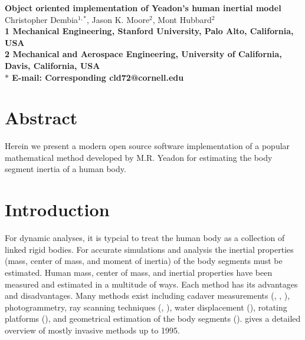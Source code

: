 \documentclass[10pt]{article}
\date{}
\begin{document}
\begin{flushleft}
{\Large
\textbf{Object oriented implementation of Yeadon's human inertial model}
}
\\
Christopher Dembia$^{1,\ast}$,
Jason K. Moore$^{2}$,
Mont Hubbard$^{2}$
\\
\bf{1} Mechanical Engineering, Stanford University, Palo Alto, California, USA
\\
\bf{2} Mechanical and Aerospace Engineering, University of California, Davis, California, USA
\\
$\ast$ E-mail: Corresponding cld72@cornell.edu
\end{flushleft}

\section*{Abstract}
Herein we present a modern open source software implementation of a popular
mathematical method developed by M.R. Yeadon for estimating the body segment
inertia of a human body.

\section*{Introduction}
For dynamic analyses, it is typcial to treat the human body as a collection of
linked rigid bodies. For accurate simulations and analysis the inertial
properties (mass, center of mass, and moment of inertia) of the body segments
must be estimated. Human mass, center of mass, and inertial properties have
been measured and estimated in a multitude of ways. Each method has its
advantages and disadvantages. Many methods exist including cadaver measurements
(\cite{Dempster1955}, \cite{Clauser1969}, \cite{Chandler1975}), photogrammetry,
ray scanning techniques (\cite{Zatsiorsky1983}, \cite{Zatsiorsky1990}), water
displacement (\cite{Park1999}), rotating platforms (\cite{Griffiths2005}), and
geometrical estimation of the body segments (\cite{Yeadon1990a}).
\cite{Bjornstrup1995} gives a detailed overview of mostly invasive methods up
to 1995.
\end{document}

